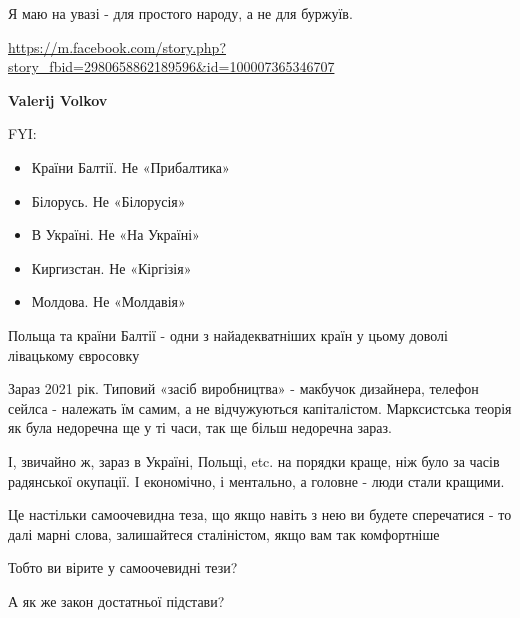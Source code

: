 \begin{itemize}
\begin{itemize}
Я маю на увазі - для простого народу, а не для буржуїв.

\url{https://m.facebook.com/story.php?story_fbid=2980658862189596&id=100007365346707}

 
\textbf{Valerij Volkov}

FYI:

\begin{itemize}
  \item Країни Балтії. Не «Прибалтика»
  \item Білорусь. Не «Білорусія»
  \item В Україні. Не «На Україні»
  \item Киргизстан. Не «Кіргізія»
  \item Молдова. Не «Молдавія»
\end{itemize}

Польща та країни Балтії - одни з найадекватніших країн у цьому доволі
лівацькому євросовку

Зараз 2021 рік. Типовий «засіб виробництва» - макбучок дизайнера, телефон
сейлса - належать їм самим, а не відчужуються капіталістом. Марксистська теорія
як була недоречна ще у ті часи, так ще більш недоречна зараз.

І, звичайно ж, зараз в Україні, Польщі, etc. на порядки краще, ніж було за
часів радянської окупації. І економічно, і ментально, а головне - люди стали
кращими.

Це настільки самоочевидна теза, що якщо навіть з нею ви будете сперечатися - то
далі марні слова, залишайтеся сталіністом, якщо вам так комфортніше


 

Тобто ви вірите у самоочевидні тези?

А як же закон достатньої підстави?

 

\end{itemize}
\end{itemize}

